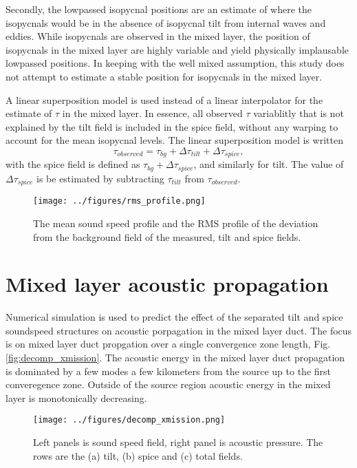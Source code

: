 \documentclass[preprint,NumberedRefs]{JASA}
\begin{document}
Secondly, the lowpassed isopycnal positions are an estimate of where the isopycnals would be in the absence of isopycnal tilt from internal waves and eddies. While isopycnals are observed in the mixed layer, the position of isopycnals in the mixed layer are highly variable and yield physically implausable lowpassed positions. In keeping with the well mixed assumption, this study does not attempt to estimate a stable position for isopycnals in the mixed layer.

A linear superposition model is used instead of a linear interpolator for the estimate of $\tau$ in the mixed layer. In essence, all observed $\tau$ variablitly that is not explained by the tilt field is included in the spice field, without any warping to account for the mean isopycnal levels. The linear superposition model is written
\begin{equation}
    \tau_{observed} = \tau_{bg} + \Delta \tau_{tilt} + \Delta \tau_{spice},
\end{equation}
with the spice field is defined as $\tau_{bg} + \Delta \tau_{spice}$, and similarly for tilt. The value of $\Delta \tau_{spice}$ is be estimated by subtracting $\tau_{tilt}$ from $\tau_{observed}$.

\begin{figure}
\texttt{[image: ../figures/rms\_profile.png]}
    \caption{\label{fig:c_rms}{The mean sound speed profile and the RMS profile of the deviation from the background field of the measured, tilt and spice fields. }}
\end{figure}

\section{\label{sec:propagation}Mixed layer acoustic propagation}
Numerical simulation is used to predict the effect of the separated tilt and spice soundspeed structures on acoustic porpagation in the mixed layer duct. The focus is on mixed layer duct propgation over a single convergence zone length, Fig. \ref{fig:decomp_xmission}. The acoustic energy in the mixed layer duct propagation is dominated by a few modes a few kilometers from the source up to the first converegence zone. Outside of the source region acoustic energy in the mixed layer is monotonically decreasing.

\begin{figure}
\texttt{[image: ../figures/decomp\_xmission.png]}
    \caption{\label{fig:decomp_x}{Left panels is sound speed field, right panel is acoustic pressure. The rows are the (a) tilt, (b) spice and (c) total fields.}}
\end{figure}
\end{document}
